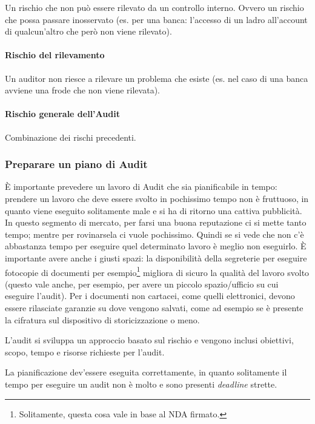 Un rischio che non può essere rilevato da un controllo interno. Ovvero un 
rischio che possa passare inosservato (es. per una banca: l'accesso di un ladro 
all'account di qualcun'altro che però non viene rilevato).


\paragraph*{Rischio del rilevamento}

Un auditor non riesce a rilevare un problema che esiste (es. nel caso 
di una banca avviene una frode che non viene rilevata).

\paragraph*{Rischio generale dell'Audit}

Combinazione dei rischi precedenti.


\subsubsection{Preparare un piano di Audit}

È importante prevedere un lavoro di Audit che sia pianificabile in tempo: 
prendere un lavoro che deve essere svolto in pochissimo tempo non è 
fruttuoso, in quanto viene eseguito solitamente male e si ha di 
ritorno una cattiva pubblicità. In questo segmento di mercato, per farsi una buona 
reputazione ci si mette tanto tempo; mentre per rovinarsela ci vuole pochissimo. 
Quindi se si vede che non c'è abbastanza tempo per eseguire quel determinato 
lavoro è meglio non eseguirlo. 
È importante avere anche i giusti spazi: la disponibilità della segreterie per 
eseguire fotocopie di documenti per esempio\footnote{Solitamente, questa cosa 
vale in base al NDA firmato.} migliora di sicuro la qualità del lavoro svolto 
(questo vale anche, per esempio, per avere un piccolo spazio/ufficio su cui 
eseguire l'audit). Per i documenti non cartacei, come quelli elettronici, 
devono essere rilasciate garanzie su dove vengono salvati, come ad esempio se è 
presente la cifratura sul dispositivo di storicizzazione o meno.

L'audit si sviluppa un approccio basato sul rischio e vengono inclusi 
obiettivi, scopo, tempo e risorse richieste per l'audit.

La pianificazione dev'essere eseguita correttamente, in quanto solitamente il 
tempo per eseguire un audit non è molto e sono presenti \textit{deadline} 
strette.

